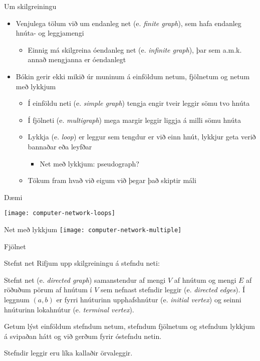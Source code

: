 \documentclass{beamer}
\begin{document}
\begin{frame}{Um skilgreiningu}
\begin{itemize}
 \item Venjulega tölum við um endanleg net (e. \emph{finite graph}), sem hafa endanleg hnúta- og leggjamengi
 \begin{itemize}
  \item Einnig má skilgreina óendanleg net (e. \emph{infinite graph}), þar sem a.m.k. annað mengjanna er óendanlegt
 \end{itemize}
 \item Bókin gerir ekki mikið úr muninum á einföldum netum, fjölnetum og netum með lykkjum
 \begin{itemize}
  \item Í einföldu neti (e. \emph{simple graph}) tengja engir tveir leggir sömu tvo hnúta
  \item Í fjölneti (e. \emph{multigraph}) mega margir leggir liggja á milli sömu hnúta
  \item Lykkja (e. \emph{loop}) er leggur sem tengdur er við einn hnút, lykkjur geta verið bannaðar eða leyfðar
  \begin{itemize}
   \item Net með lykkjum: pseudograph?
  \end{itemize}
  \item Tökum fram hvað við eigum við þegar það skiptir máli
 \end{itemize}
\end{itemize}
\end{frame}

\begin{frame}{Dæmi}
\begin{center}
\texttt{[image: computer-network-loops]}

Net með lykkjum
\texttt{[image: computer-network-multiple]}

Fjölnet
\end{center}
\end{frame}

\begin{frame}{Stefnt net}
Rifjum upp skilgreiningu á stefndu neti:
\begin{tcolorbox}[title=Stefnt net]
Stefnt net (e. \emph{directed graph}) samanstendur af mengi $V$ af hnútum og mengi $E$ af röðuðum pörum af hnútum í $V$ sem nefnast stefndir leggir (e. \emph{directed edges}). Í leggnum $(a, b)$ er fyrri hnúturinn upphafshnútur (e. \emph{initial vertex}) og seinni hnúturinn lokahnútur (e. \emph{terminal vertex}).
\end{tcolorbox}

Getum lýst einföldum stefndum netum, stefndum fjölnetum og stefndum lykkjum á svipaðan hátt og við gerðum fyrir óstefndu netin.

Stefndir leggir eru líka kallaðir örvaleggir.
\end{frame}
\end{document}
